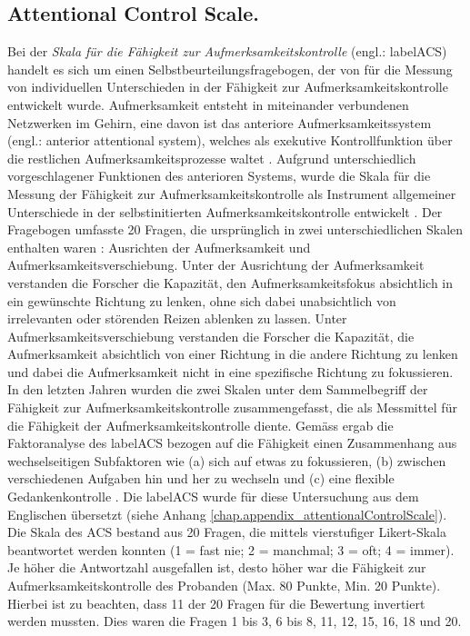 \subsection{Attentional Control Scale.} \label{subsection.acs}
Bei der \textit{Skala für die Fähigkeit zur Aufmerksamkeitskontrolle} (engl.: \gls{labelACS}) handelt es sich um einen Selbstbeurteilungsfragebogen, der von  für die Messung von individuellen Unterschieden in der Fähigkeit zur Aufmerksamkeitskontrolle entwickelt wurde. Aufmerksamkeit entsteht in miteinander verbundenen Netzwerken im Gehirn, eine davon ist das anteriore Aufmerksamkeitssystem (engl.: anterior attentional system), welches als exekutive Kontrollfunktion über die restlichen Aufmerksamkeitsprozesse waltet \cite{Posner1998}. Aufgrund unterschiedlich vorgeschlagener Funktionen des anterioren Systems, wurde die Skala für die Messung der Fähigkeit zur Aufmerksamkeitskontrolle als Instrument allgemeiner Unterschiede in der selbstinitierten Aufmerksamkeitskontrolle entwickelt \cite{Derryberry2001}. Der Fragebogen umfasste 20 Fragen, die ursprünglich in zwei unterschiedlichen Skalen enthalten waren \cite{Derryberry1988}: Ausrichten der Aufmerksamkeit und Aufmerksamkeitsverschiebung. Unter der Ausrichtung der Aufmerksamkeit verstanden die Forscher die Kapazität, den Aufmerksamkeitsfokus absichtlich in ein gewünschte Richtung zu lenken, ohne sich dabei unabsichtlich von irrelevanten oder störenden Reizen ablenken zu lassen. Unter Aufmerksamkeitsverschiebung verstanden die Forscher die Kapazität, die Aufmerksamkeit absichtlich von einer Richtung in die andere Richtung zu lenken und dabei die Aufmerksamkeit nicht in eine spezifische Richtung zu fokussieren. In den letzten Jahren wurden die zwei Skalen unter dem Sammelbegriff der Fähigkeit zur Aufmerksamkeitskontrolle zusammengefasst, die als Messmittel für die Fähigkeit der Aufmerksamkeitskontrolle diente. Gemäss  ergab die Faktoranalyse des \gls{labelACS} bezogen auf die Fähigkeit einen Zusammenhang aus wechselseitigen Subfaktoren wie (a) sich auf etwas zu fokussieren, (b) zwischen verschiedenen Aufgaben hin und her zu wechseln und (c) eine flexible Gedankenkontrolle \cite{Derryberry2002}. Die \gls{labelACS} wurde für diese Untersuchung aus dem Englischen übersetzt (siehe Anhang \ref{chap.appendix_attentionalControlScale}). Die Skala des ACS bestand aus 20 Fragen, die mittels vierstufiger Likert-Skala beantwortet werden konnten (1 = fast nie; 2 = manchmal; 3 = oft; 4 = immer). Je höher die Antwortzahl ausgefallen ist, desto höher war die Fähigkeit zur Aufmerksamkeitskontrolle des Probanden (Max. 80 Punkte, Min. 20 Punkte). Hierbei ist zu beachten, dass 11 der 20 Fragen für die Bewertung invertiert werden mussten. Dies waren die Fragen 1 bis 3, 6 bis 8, 11, 12, 15, 16, 18 und 20.

